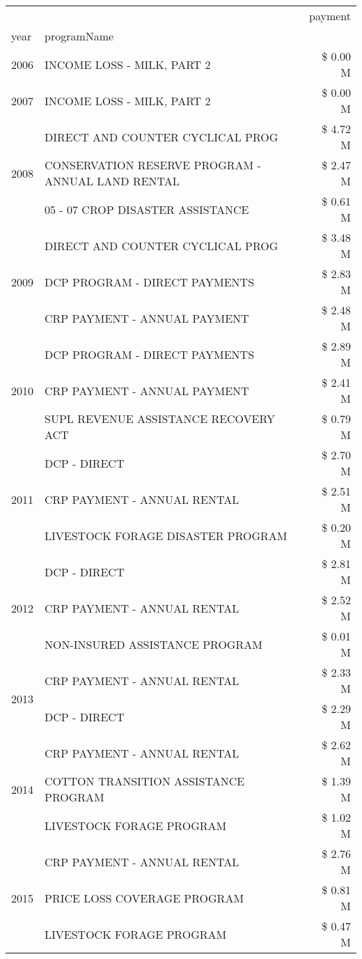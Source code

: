 \begin{tabular}{llr}
\toprule
 &  & payment \\
year & programName &  \\
\midrule
2006 & INCOME LOSS - MILK, PART 2 & \$ 0.00 M \\
\cline{1-3}
2007 & INCOME LOSS - MILK, PART 2 & \$ 0.00 M \\
\cline{1-3}
\multirow[t]{3}{*}{2008} & DIRECT AND COUNTER CYCLICAL PROG & \$ 4.72 M \\
 & CONSERVATION RESERVE PROGRAM - ANNUAL LAND RENTAL & \$ 2.47 M \\
 & 05 - 07 CROP DISASTER ASSISTANCE & \$ 0.61 M \\
\cline{1-3}
\multirow[t]{3}{*}{2009} & DIRECT AND COUNTER CYCLICAL PROG & \$ 3.48 M \\
 & DCP PROGRAM - DIRECT PAYMENTS & \$ 2.83 M \\
 & CRP PAYMENT - ANNUAL PAYMENT & \$ 2.48 M \\
\cline{1-3}
\multirow[t]{3}{*}{2010} & DCP PROGRAM - DIRECT PAYMENTS & \$ 2.89 M \\
 & CRP PAYMENT - ANNUAL PAYMENT & \$ 2.41 M \\
 & SUPL REVENUE ASSISTANCE RECOVERY ACT & \$ 0.79 M \\
\cline{1-3}
\multirow[t]{3}{*}{2011} & DCP - DIRECT & \$ 2.70 M \\
 & CRP PAYMENT - ANNUAL RENTAL & \$ 2.51 M \\
 & LIVESTOCK FORAGE DISASTER PROGRAM & \$ 0.20 M \\
\cline{1-3}
\multirow[t]{3}{*}{2012} & DCP - DIRECT & \$ 2.81 M \\
 & CRP PAYMENT - ANNUAL RENTAL & \$ 2.52 M \\
 & NON-INSURED ASSISTANCE PROGRAM & \$ 0.01 M \\
\cline{1-3}
\multirow[t]{2}{*}{2013} & CRP PAYMENT - ANNUAL RENTAL & \$ 2.33 M \\
 & DCP - DIRECT & \$ 2.29 M \\
\cline{1-3}
\multirow[t]{3}{*}{2014} & CRP PAYMENT - ANNUAL RENTAL & \$ 2.62 M \\
 & COTTON TRANSITION ASSISTANCE PROGRAM & \$ 1.39 M \\
 & LIVESTOCK FORAGE PROGRAM & \$ 1.02 M \\
\cline{1-3}
\multirow[t]{3}{*}{2015} & CRP PAYMENT - ANNUAL RENTAL & \$ 2.76 M \\
 & PRICE LOSS COVERAGE PROGRAM & \$ 0.81 M \\
 & LIVESTOCK FORAGE PROGRAM & \$ 0.47 M \\

\end{tabular}
